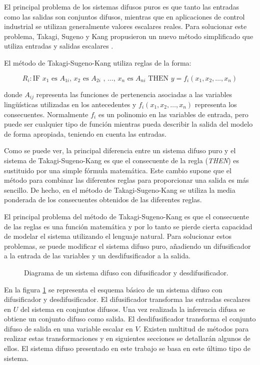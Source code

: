 El principal problema de los sistemas difusos puros es que tanto las entradas como las salidas son conjuntos difusos, mientras que en aplicaciones de control industrial se utilizan generalmente valores escalares reales. Para solucionar este problema, Takagi, Sugeno y Kang propusieron un nuevo método simplificado que utiliza entradas y salidas escalares \cite{takagisugeno1985}\cite{sugenokang1988}.

El método de Takagi-Sugeno-Kang utiliza reglas de la forma:

\begin{equation}
R_{i}: \text{IF }x_{1}\text{ es }A_{1i}\text{, }x_{2}\text{ es }A_{2i}\text{ , \ldots , }x_{n}\text{ es }A_{ni}\text{ THEN } y = f_{i}(x_{1},x_{2},\ldots,x_{n})
\end{equation}

donde $A_{ij}$ representa las funciones de pertenencia asociadas a las variables lingüísticas utilizadas en los antecedentes y $f_{i}(x_{1},x_{2},\ldots,x_{n})$ representa los consecuentes. Normalmente $f_{i}$ es un polinomio en las variables de entrada, pero puede ser cualquier tipo de función mientras pueda describir la salida del modelo de forma apropiada, teniendo en cuenta las entradas. 

Como se puede ver, la principal diferencia entre un sistema difuso puro y el sistema de Takagi-Sugeno-Kang es que el consecuente de la regla (\emph{THEN}) es sustituido por una simple fórmula matemática. Este cambio supone que el método para combinar las diferentes reglas para proporcionar una salida es más sencillo. De hecho, en el método de Takagi-Sugeno-Kang se utiliza la media ponderada de los consecuentes obtenidos de las diferentes reglas.

El principal problema del método de Takagi-Sugeno-Kang es que el consecuente de las reglas es una función matemática y por lo tanto se pierde cierta capacidad de modelar el sistema utilizando el lenguaje natural. Para solucionar estos problemas, se puede modificar el sistema difuso puro, añadiendo un difusificador a la entrada de las variables y un desdifusificador a la salida.

\begin{figure}[tb]
	\centering
	
	\caption{Diagrama de un sistema difuso con difusificador y desdifusificador.}
	\label{fig:fuzzy-system}
\end{figure}

En la figura \ref{fig:fuzzy-system} se representa el esquema básico de un sistema difuso con difusificador y desdifusificador. El difusificador transforma las entradas escalares en $U$ del sistema en conjuntos difusos. Una vez realizada la inferencia difusa se obtiene un conjunto difuso como salida. El desdifusificador transforma el conjunto difuso de salida en una variable escalar en $V$. Existen multitud de métodos para realizar estas transformaciones y en siguientes secciones se detallarán algunos de ellos. El sistema difuso presentado en este trabajo se basa en este último tipo de sistema.

